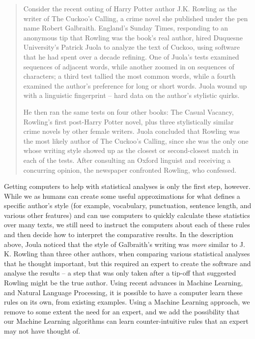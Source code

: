 \begin{quote}
Consider the recent outing of Harry Potter author J.K. Rowling as the writer of The Cuckoo’s Calling, a crime novel she published under the pen name Robert Galbraith. England’s Sunday Times, responding to an anonymous tip that Rowling was the book’s real author, hired Duquesne University’s Patrick Juola to analyze the text of Cuckoo, using software that he had spent over a decade refining. One of Juola’s tests examined sequences of adjacent words, while another zoomed in on sequences of characters; a third test tallied the most common words, while a fourth examined the author’s preference for long or short words. Juola wound up with a linguistic fingerprint -- hard data on the author’s stylistic quirks.

He then ran the same tests on four other books: The Casual Vacancy, Rowling’s first post-Harry Potter novel, plus three stylistically similar crime novels by other female writers. Juola concluded that Rowling was the most likely author of The Cuckoo’s Calling, since she was the only one whose writing style showed up as the closest or second-closest match in each of the tests. After consulting an Oxford linguist and receiving a concurring opinion, the newspaper confronted Rowling, who confessed.
\end{quote}

Getting computers to help with statistical analyses is only the first step, however. While we as humans can create some useful approximations for what defines a specific author's style (for example, vocabulary, punctuation, sentence length, and various other features) and can use computers to quickly calculate these statistics over many texts, we still need to instruct the computers about each of these rules and then decide how to interpret the comparative results. In the description above, Joula noticed that the style of Galbraith's writing was \textit{more} similar to J. K. Rowling than three other authors, when comparing various statistical analyses that he thought important, but this required an expert to create the software and analyse the results -- a step that was only taken after a tip-off that suggested Rowling might be the true author. Using recent advances in Machine Learning, and Natural Language Processing, it is possible to have a computer learn these rules on its own, from existing examples. Using a Machine Learning approach, we remove to some extent the need for an expert, and we add the possibility that our Machine Learning algorithms can learn counter-intuitive rules that an expert may not have thought of.

